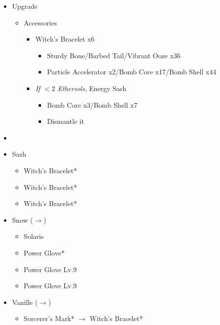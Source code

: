 \begin{upgrade}
	\begin{itemize}
		\item Upgrade
			\begin{itemize}
				\item Accessories
					\begin{itemize}
						\item Witch's Bracelet x6
							\begin{itemize}
								\item Sturdy Bone/Barbed Tail/Vibrant Ooze x36
								\item Particle Accelerator x2/Bomb Core x17/Bomb Shell x44
							\end{itemize}
						\item \textit{If $<2$ Ethersols}, Energy Sash
							\begin{itemize}
								\item Bomb Core x3/Bomb Shell x7
								\item Dismantle it
							\end{itemize}
					\end{itemize}
			\end{itemize}
	\end{itemize}
\end{upgrade}
\vfill
\begin{menu}
	\begin{itemize}
	\paradigm
		\begin{itemize}
			\item {}%
				{\paradigmline{\com}{(\rav)}{(\rav)}}%
				{\paradigmline{\com}{(\rav)}{\med}}%
				{\paradigmline{(\rav)}{(\sen)}{(\med)}}%
				{\paradigmline[4]{\com}{\sen}{\med}}%
				{\paradigmline{\syn}{\sen}{\med}}%
				{\paradigmline{\rav}{\rav}{\sab}}%
		\end{itemize}
	\equip
		\begin{itemize}
			\item Sazh
				\begin{itemize}
					\item Witch's Bracelet*
					\item Witch's Bracelet*
					\item Witch's Bracelet*
				\end{itemize}
			\item Snow ($\rightarrow$)
				\begin{itemize}
					\item Solaris
					\item Power Glove*
					\item Power Glove Lv.9
					\item Power Glove Lv.9
				\end{itemize}
			\item Vanille ($\rightarrow$)
				\begin{itemize}
					\item Sorcerer's Mark* $\rightarrow$ Witch's Bracelet*
				\end{itemize}
		\end{itemize}
	\end{itemize}
\end{menu}

